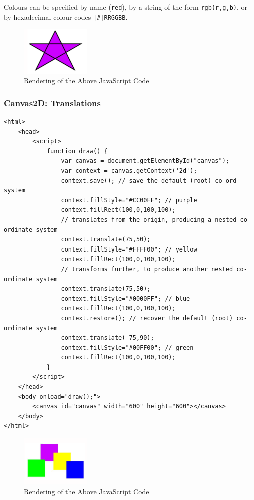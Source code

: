 \documentclass[a4paper,11pt]{article}
\begin{document}
Colours can be specified by name (\texttt{red}), by a string of the form
\texttt{rgb(r,g,b)}, or by hexadecimal colour codes \texttt{|#|RRGGBB}.

\begin{figure}[H]
    \centering
    \includegraphics[width=0.3\textwidth]{images/canvas2d_fill_stroke.png}
    \caption{Rendering of the Above JavaScript Code}
\end{figure}

\subsubsection{Canvas2D: Translations}
\begin{verbatim}
<html>
    <head>
        <script>
            function draw() {
                var canvas = document.getElementById("canvas");
                var context = canvas.getContext('2d');
                context.save(); // save the default (root) co-ord system
                context.fillStyle="#CC00FF"; // purple
                context.fillRect(100,0,100,100);
                // translates from the origin, producing a nested co-ordinate system
                context.translate(75,50);
                context.fillStyle="#FFFF00"; // yellow
                context.fillRect(100,0,100,100);
                // transforms further, to produce another nested co-ordinate system
                context.translate(75,50);
                context.fillStyle="#0000FF"; // blue
                context.fillRect(100,0,100,100);
                context.restore(); // recover the default (root) co-ordinate system
                context.translate(-75,90);
                context.fillStyle="#00FF00"; // green
                context.fillRect(100,0,100,100);
            }
        </script>
    </head>
    <body onload="draw();">
        <canvas id="canvas" width="600" height="600"></canvas>
    </body>
</html>
\end{verbatim}

\begin{figure}[H]
    \centering
    \includegraphics[width=0.3\textwidth]{images/canvas2d_translations.png}
    \caption{Rendering of the Above JavaScript Code}
\end{figure}
\end{document}
